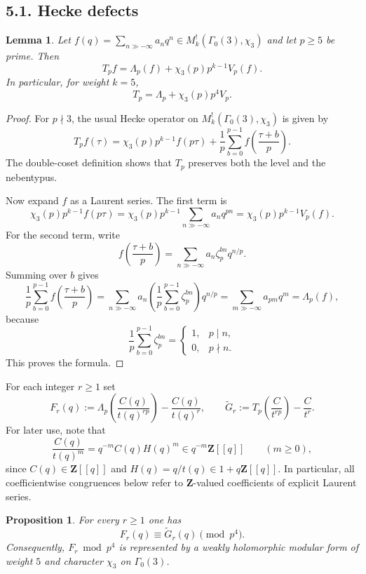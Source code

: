 \documentclass[11pt]{amsart}
\newtheorem{lemma}[theorem]{Lemma}
\newtheorem{proposition}[theorem]{Proposition}
\theoremstyle{remark}
\newcommand{\Z}{\mathbf{Z}}
\begin{document}
\subsection*{5.1. Hecke defects}

\begin{lemma}\label{lem:hecke-decomp}
Let $f(q)=\sum_{n\gg-\infty} a_n q^n\in M_k^!(\Gamma_0(3),\chi_3)$ and let $p\ge5$ be prime. Then
\[
T_p f = \Lambda_p(f)+\chi_3(p)p^{k-1}V_p(f).
\]
In particular, for weight $k=5$,
\[
T_p=\Lambda_p+\chi_3(p)p^4V_p.
\]
\end{lemma}

\begin{proof}
For $p\nmid3$, the usual Hecke operator on $M_k^!(\Gamma_0(3),\chi_3)$ is given by
\[
T_p f(\tau)=\chi_3(p)p^{k-1}f(p\tau)+\frac1p\sum_{b=0}^{p-1} f\!\left(\frac{\tau+b}{p}\right).
\]
The double-coset definition shows that $T_p$ preserves both the level and the nebentypus.

Now expand $f$ as a Laurent series. The first term is
\[
\chi_3(p)p^{k-1}f(p\tau)=\chi_3(p)p^{k-1}\sum_{n\gg-\infty} a_n q^{pn}
=
\chi_3(p)p^{k-1}V_p(f).
\]
For the second term, write
\[
f\!\left(\frac{\tau+b}{p}\right)=\sum_{n\gg-\infty} a_n \zeta_p^{bn}q^{n/p}.
\]
Summing over $b$ gives
\[
\frac1p\sum_{b=0}^{p-1}f\!\left(\frac{\tau+b}{p}\right)
=\sum_{n\gg-\infty} a_n\left(\frac1p\sum_{b=0}^{p-1}\zeta_p^{bn}\right)q^{n/p}
=\sum_{m\gg-\infty} a_{pm}q^m
=\Lambda_p(f),
\]
because
\[
\frac1p\sum_{b=0}^{p-1}\zeta_p^{bn}=
\begin{cases}
1,& p\mid n,\\
0,& p\nmid n.
\end{cases}
\]
This proves the formula.
\end{proof}

For each integer $r\ge1$ set
\[
F_r(q):=\Lambda_p\!\left(\frac{C(q)}{t(q)^{rp}}\right)-\frac{C(q)}{t(q)^r},
\qquad
\widetilde G_r:=T_p\!\left(\frac{C}{t^{rp}}\right)-\frac{C}{t^r}.
\]
For later use, note that
\[
\frac{C(q)}{t(q)^m}=q^{-m}C(q)H(q)^m\in q^{-m}\Z[[q]]
\qquad (m\ge0),
\]
since $C(q)\in\Z[[q]]$ and $H(q)=q/t(q)\in 1+q\Z[[q]]$. In particular, all coefficientwise
congruences below refer to $\Z$-valued coefficients of explicit Laurent series.

\begin{proposition}\label{prop:defect-congruence}
For every $r\ge1$ one has
\[
F_r(q)\equiv \widetilde G_r(q)\pmod{p^4}.
\]
Consequently, $F_r\bmod p^4$ is represented by a weakly holomorphic modular form of weight $5$ and character $\chi_3$ on $\Gamma_0(3)$.
\end{proposition}
\end{document}

